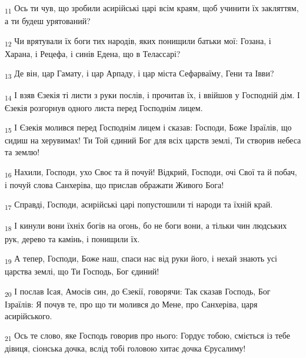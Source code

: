 \begin{tcolorbox}
\textsubscript{11} Ось ти чув, що зробили асирійські царі всім краям, щоб учинити їх закляттям, а ти будеш урятований?
\end{tcolorbox}
\begin{tcolorbox}
\textsubscript{12} Чи врятували їх боги тих народів, яких понищили батьки мої: Гозана, і Харана, і Рецефа, і синів Едена, що в Телассарі?
\end{tcolorbox}
\begin{tcolorbox}
\textsubscript{13} Де він, цар Гамату, і цар Арпаду, і цар міста Сефарваїму, Гени та Івви?
\end{tcolorbox}
\begin{tcolorbox}
\textsubscript{14} І взяв Єзекія ті листи з руки послів, і прочитав їх, і ввійшов у Господній дім. І Єзекія розгорнув одного листа перед Господнім лицем.
\end{tcolorbox}
\begin{tcolorbox}
\textsubscript{15} І Єзекія молився перед Господнім лицем і сказав: Господи, Боже Ізраїлів, що сидиш на херувимах! Ти Той єдиний Бог для всіх царств землі, Ти створив небеса та землю!
\end{tcolorbox}
\begin{tcolorbox}
\textsubscript{16} Нахили, Господи, ухо Своє та й почуй! Відкрий, Господи, очі Свої та й побач, і почуй слова Санхеріва, що прислав ображати Живого Бога!
\end{tcolorbox}
\begin{tcolorbox}
\textsubscript{17} Справді, Господи, асирійські царі попустошили ті народи та їхній край.
\end{tcolorbox}
\begin{tcolorbox}
\textsubscript{18} І кинули вони їхніх богів на огонь, бо не боги вони, а тільки чин людських рук, дерево та камінь, і понищили їх.
\end{tcolorbox}
\begin{tcolorbox}
\textsubscript{19} А тепер, Господи, Боже наш, спаси нас від руки його, і нехай знають усі царства землі, що Ти Господь, Бог єдиний!
\end{tcolorbox}
\begin{tcolorbox}
\textsubscript{20} І послав Ісая, Амосів син, до Єзекії, говорячи: Так сказав Господь, Бог Ізраїлів: Я почув те, про що ти молився до Мене, про Санхеріва, царя асирійського.
\end{tcolorbox}
\begin{tcolorbox}
\textsubscript{21} Ось те слово, яке Господь говорив про нього: Гордує тобою, сміється із тебе дівиця, сіонська дочка, вслід тобі головою хитає дочка Єрусалиму!
\end{tcolorbox}

